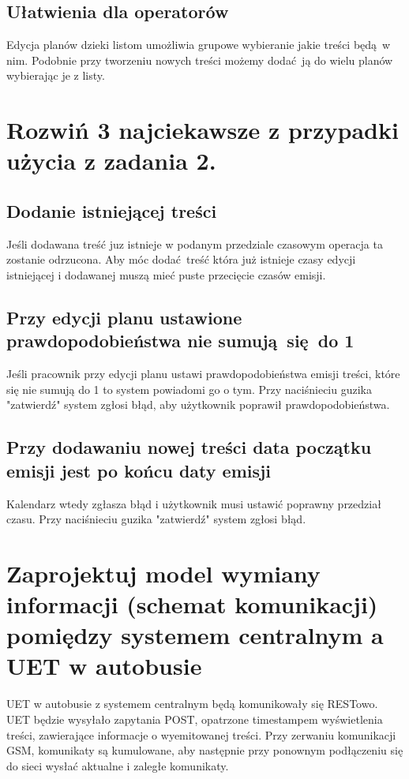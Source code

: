 \documentclass{article}
\begin{document}
    \subsection{Ułatwienia dla operatorów}
      Edycja planów dzieki listom umożliwia grupowe wybieranie jakie treści będą w nim. 
      Podobnie przy tworzeniu nowych treści możemy dodać ją do wielu planów wybierając je z listy.


  \newpage
  \section{Rozwiń 3 najciekawsze z przypadki użycia z zadania 2.}
    \subsection{Dodanie istniejącej treści}
      Jeśli dodawana treść juz istnieje w podanym przedziale czasowym operacja ta zostanie odrzucona. 
      Aby móc dodać treść która już istnieje czasy edycji istniejącej i dodawanej muszą mieć puste przecięcie czasów emisji.

    \subsection{Przy edycji planu ustawione prawdopodobieństwa nie sumują się do 1}
      Jeśli pracownik przy edycji planu ustawi prawdopodobieństwa emisji treści, które się nie sumują do 1 to system powiadomi go o tym.
      Przy naciśnieciu guzika "zatwierdź" system zgłosi błąd, aby użytkownik poprawił prawdopodobieństwa.

    \subsection{Przy dodawaniu nowej treści data początku emisji jest po końcu daty emisji}
      Kalendarz wtedy zgłasza błąd i użytkownik musi ustawić poprawny przedział czasu.
      Przy naciśnieciu guzika "zatwierdź" system zgłosi błąd.


  \newpage
  \section{Zaprojektuj model wymiany informacji (schemat komunikacji) pomiędzy systemem centralnym a UET w autobusie}
    UET w autobusie z systemem centralnym będą komunikowały się RESTowo. 
    UET będzie wysyłało zapytania POST, opatrzone timestampem wyświetlenia treści, zawierające informacje o wyemitowanej treści.
    Przy zerwaniu komunikacji GSM, komunikaty są kumulowane, aby następnie przy ponownym podłączeniu się do sieci wysłać aktualne i zaległe komunikaty.
\end{document}
